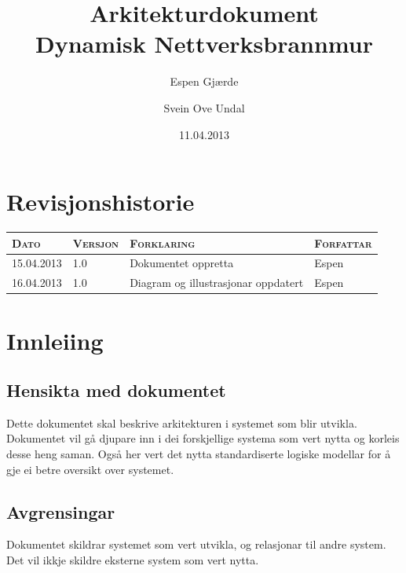 \documentclass[nynorsk,12pt,a4paper]{article}
\title{Arkitekturdokument\\
Dynamisk Nettverksbrannmur
}
\author{Espen Gjærde \and Svein Ove Undal}
\date{11.04.2013}
\begin{document}
\maketitle
\newpage

\section*{Revisjonshistorie}

\begin{table}[h!]
	\begin{tabular}{ l l l l }

		\textsc{Dato} & \textsc{Versjon} & \textsc{Forklaring} & \textsc{Forfattar} \\
		\hline 
		15.04.2013 & 1.0 & Dokumentet oppretta & Espen \\ 
		16.04.2013 & 1.0 & Diagram og illustrasjonar oppdatert & Espen \\
		\hline
	\end{tabular}
\end{table}

\newpage
\tableofcontents{}

\newpage

\section{Innleiing}
\subsection{Hensikta med dokumentet}
Dette dokumentet skal beskrive arkitekturen i systemet som blir utvikla. Dokumentet vil gå djupare inn i dei forskjellige systema som vert nytta og korleis desse heng saman. Også her vert det nytta standardiserte logiske modellar for å gje ei betre oversikt over systemet.

\subsection{Avgrensingar}
Dokumentet skildrar systemet som vert utvikla, og relasjonar til andre system. Det vil ikkje skildre eksterne system som vert nytta.
\end{document}

